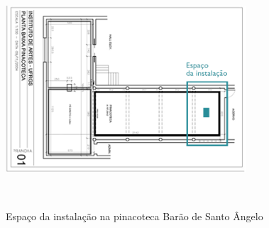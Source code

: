 \begin{figure}[H]
  \begin{center}
    \caption{Espaço da instalação na pinacoteca Barão de Santo Ângelo}
    \vspace*{0,2cm}
    \includegraphics[width=0.8\textwidth]{./04-figuras/pinacoteca}
    \label{fig:pinacoteca}
  \end{center}
  \vspace*{-0,9cm}
  \\
\end{figure}
